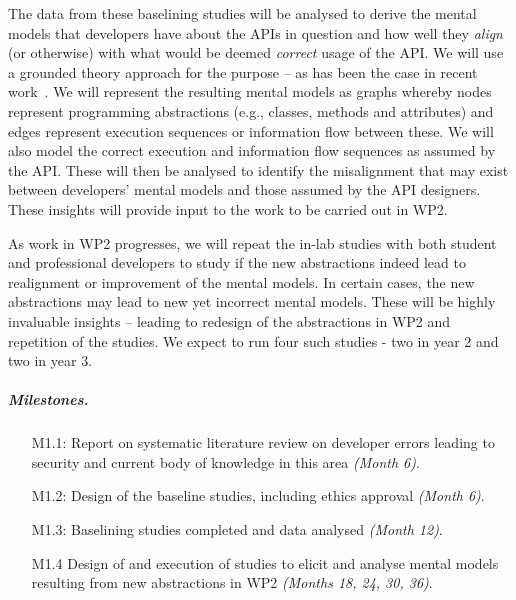 \documentclass[10pt]{article}
\begin{document}
\begin{description}
The data from these baselining studies will be analysed to derive the mental models that developers have about the APIs in question and how well they \emph{align} (or otherwise) with what would be deemed \emph{correct} usage of the API. We will use a grounded theory approach for the purpose -- as has been the case in recent work~\cite{ramokapane2017}. We will represent the resulting mental models as graphs whereby nodes represent programming abstractions (e.g., classes, methods and attributes) and edges represent execution sequences or information flow between these. We will also model the correct execution and information flow sequences as assumed by the API. These will then be analysed to identify the misalignment that may exist between developers' mental models and those assumed by the API designers. These insights will provide input to the work to be carried out in WP2.

As work in WP2 progresses, we will repeat the in-lab studies with both student and professional developers to study if the new abstractions indeed lead to realignment or improvement of the mental models. In certain cases, the new abstractions may lead to new yet incorrect mental models. These will be highly invaluable insights -- leading to redesign of the abstractions in WP2 and repetition of the studies. We expect to run four such studies - two in year 2 and two in year 3.

\subparagraph{Milestones.} 

\begin{itemize}

\item[M1.1:] Report on systematic literature review on developer errors leading to security and current body of knowledge in this area \textit{(Month 6)}.

\item[M1.2:] Design of the baseline studies, including ethics approval \textit{(Month 6)}.

\item[M1.3:] Baselining studies completed and data analysed \textit{(Month 12)}.

\item[M1.4] Design of and execution of studies to elicit and analyse mental models resulting from new abstractions in WP2 \textit{(Months 18, 24, 30, 36)}.

\end{itemize} 

\vspace{.3cm}


\end{description}
\end{document}
